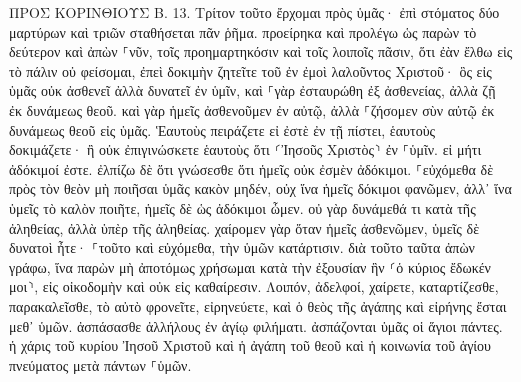 \documentclass[twoside, 9pt]{extreport}
\begin{document}
ΠΡΟΣ ΚΟΡΙΝΘΙΟΥΣ Β.
13.
Τρίτον τοῦτο ἔρχομαι πρὸς ὑμᾶς· ἐπὶ στόματος δύο μαρτύρων καὶ τριῶν σταθήσεται πᾶν ῥῆμα. 
προείρηκα καὶ προλέγω ὡς παρὼν τὸ δεύτερον καὶ ἀπὼν ⸀νῦν, τοῖς προημαρτηκόσιν καὶ τοῖς λοιποῖς πᾶσιν, ὅτι ἐὰν ἔλθω εἰς τὸ πάλιν οὐ φείσομαι, 
ἐπεὶ δοκιμὴν ζητεῖτε τοῦ ἐν ἐμοὶ λαλοῦντος Χριστοῦ· ὃς εἰς ὑμᾶς οὐκ ἀσθενεῖ ἀλλὰ δυνατεῖ ἐν ὑμῖν, 
καὶ ⸀γὰρ ἐσταυρώθη ἐξ ἀσθενείας, ἀλλὰ ζῇ ἐκ δυνάμεως θεοῦ. καὶ γὰρ ἡμεῖς ἀσθενοῦμεν ἐν αὐτῷ, ἀλλὰ ⸀ζήσομεν σὺν αὐτῷ ἐκ δυνάμεως θεοῦ εἰς ὑμᾶς. 
Ἑαυτοὺς πειράζετε εἰ ἐστὲ ἐν τῇ πίστει, ἑαυτοὺς δοκιμάζετε· ἢ οὐκ ἐπιγινώσκετε ἑαυτοὺς ὅτι ⸂Ἰησοῦς Χριστὸς⸃ ἐν ⸀ὑμῖν. εἰ μήτι ἀδόκιμοί ἐστε. 
ἐλπίζω δὲ ὅτι γνώσεσθε ὅτι ἡμεῖς οὐκ ἐσμὲν ἀδόκιμοι. 
⸀εὐχόμεθα δὲ πρὸς τὸν θεὸν μὴ ποιῆσαι ὑμᾶς κακὸν μηδέν, οὐχ ἵνα ἡμεῖς δόκιμοι φανῶμεν, ἀλλ᾽ ἵνα ὑμεῖς τὸ καλὸν ποιῆτε, ἡμεῖς δὲ ὡς ἀδόκιμοι ὦμεν. 
οὐ γὰρ δυνάμεθά τι κατὰ τῆς ἀληθείας, ἀλλὰ ὑπὲρ τῆς ἀληθείας. 
χαίρομεν γὰρ ὅταν ἡμεῖς ἀσθενῶμεν, ὑμεῖς δὲ δυνατοὶ ἦτε· ⸀τοῦτο καὶ εὐχόμεθα, τὴν ὑμῶν κατάρτισιν. 
διὰ τοῦτο ταῦτα ἀπὼν γράφω, ἵνα παρὼν μὴ ἀποτόμως χρήσωμαι κατὰ τὴν ἐξουσίαν ἣν ⸂ὁ κύριος ἔδωκέν μοι⸃, εἰς οἰκοδομὴν καὶ οὐκ εἰς καθαίρεσιν. 
Λοιπόν, ἀδελφοί, χαίρετε, καταρτίζεσθε, παρακαλεῖσθε, τὸ αὐτὸ φρονεῖτε, εἰρηνεύετε, καὶ ὁ θεὸς τῆς ἀγάπης καὶ εἰρήνης ἔσται μεθ᾽ ὑμῶν. 
ἀσπάσασθε ἀλλήλους ἐν ἁγίῳ φιλήματι. ἀσπάζονται ὑμᾶς οἱ ἅγιοι πάντες. 
ἡ χάρις τοῦ κυρίου Ἰησοῦ Χριστοῦ καὶ ἡ ἀγάπη τοῦ θεοῦ καὶ ἡ κοινωνία τοῦ ἁγίου πνεύματος μετὰ πάντων ⸀ὑμῶν. 
\end{document}
